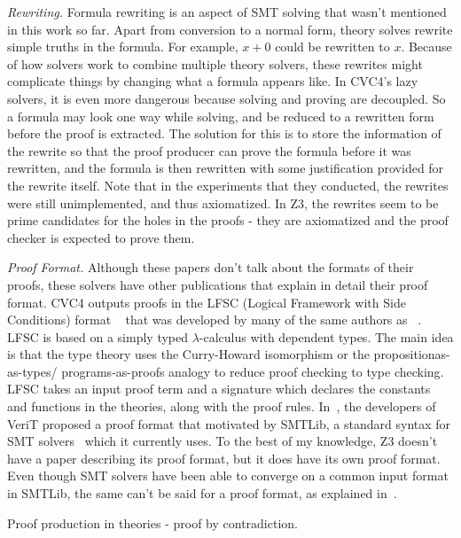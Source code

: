 \documentclass{article}
\begin{document}
\textit{Rewriting.} Formula rewriting is an aspect 
of SMT solving that wasn't mentioned in this work 
so far. Apart from conversion to a normal form, 
theory solves rewrite simple truths in the formula.
For example, $x + 0$ could be rewritten to $x$. 
Because of how solvers work to combine multiple 
theory solvers, these rewrites might complicate 
things by changing what a formula appears like. In CVC4's
lazy solvers, it is even more dangerous because 
solving and proving are decoupled. So a formula may 
look one way while solving, and be reduced to a 
rewritten form before the proof is extracted. The 
solution for this is to store the information of the 
rewrite so that the proof producer can prove the 
formula before it was rewritten, and the formula 
is then rewritten with some justification provided 
for the rewrite itself. Note that in the experiments 
that they conducted, the rewrites were still 
unimplemented, and thus axiomatized. In Z3, the 
rewrites seem to be prime candidates for the holes
in the proofs - they are axiomatized and the proof
checker is expected to prove them.

\textit{Proof Format.} Although these papers don't 
talk about the formats of their proofs, these solvers
have other publications that explain in detail their 
proof format. CVC4 outputs proofs in the LFSC 
(Logical Framework with Side Conditions) format 
~\cite{DBLP:journals/fmsd/StumpORHT13} that 
was developed by many of the same authors as 
~\cite{DBLP:conf/fmcad/KatzBTRH16}. LFSC is based on 
a simply typed $\lambda$-calculus with dependent types. 
The main idea is that the type theory uses the 
Curry-Howard isomorphism or the propositionas-as-types/
programs-as-proofs analogy to reduce 
proof checking to type checking. LFSC takes an 
input proof term and a signature which declares the 
constants and functions in the theories, along 
with the proof rules. In~\cite{Besson2011AFP}, the 
developers of VeriT proposed a proof format that 
motivated by SMTLib, a standard syntax for 
SMT solvers~\cite{BarFT-SMTLIB} which it 
currently uses. To the best of my knowledge, Z3 
doesn't have a paper describing its proof format, 
but it does have its own proof format. Even though 
SMT solvers have been able to converge on a common 
input format in SMTLib, the same can't be said for 
a proof format, as explained in~\cite{Fontaine2014ProofsIS}.


Proof production in theories - proof by contradiction.
\end{document}
